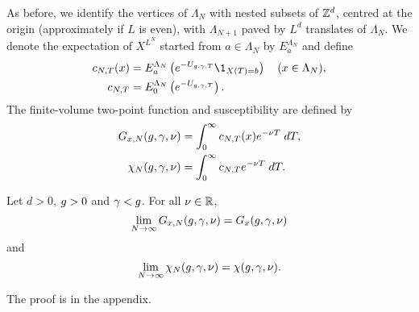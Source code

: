 As before, we identify the vertices of $\Lambda_N$ with nested subsets of ${ {{\mathbb Z}}^d }$,
centred at the origin (approximately if $L$ is even),
with $\Lambda_{N+1}$ paved by $L^d$ translates of $\Lambda_N$.
We denote the expectation of $X^{L^N}$ started from $a \in \Lambda_N$ by $E^{\Lambda_N}_a$
and define
\begin{align}
\label{e:cN}
c_{N,T}(x)
    &= E^{\Lambda_N}_a \left( e^{-U_{\gcc,\gamma,T}} \1_{X(T)=b} \right)
    \quad (x \in \Lambda_N), \\
c_{N,T}
    &= E^{\Lambda_N}_0 \left( e^{-U_{\gcc,\gamma,T}} \right).
\end{align}
The finite-volume two-point function and susceptibility
are defined by
\begin{align}
G_{x,N}(g,\gamma,\nu)
    &=
\int_0^\infty c_{N,T}(x) e^{-\nu T} \; dT, \\
\label{e:chiNdef}
\chi_N(g, \gamma, \nu)
    &=
\int_0^\infty c_{N,T} e^{-\nu T} \; dT.
\end{align}

\begin{prop}
\label{prop:finvol}
Let $d >0$, $g >0$ and $\gamma < g$. For all $\nu \in {\mathbb R}$,
\begin{equation}
\label{e:Givlc}
\lim_{N \rightarrow \infty}
G_{x,N}(g,\gamma,\nu)
=
G_x(g,\gamma,\nu)
\end{equation}
and
\begin{equation}
\label{e:chilim}
\lim_{N\rightarrow\infty}\chi_N(g,\gamma,\nu) =   \chi(g,\gamma,\nu).
\end{equation}
\end{prop}

The proof is in the appendix.